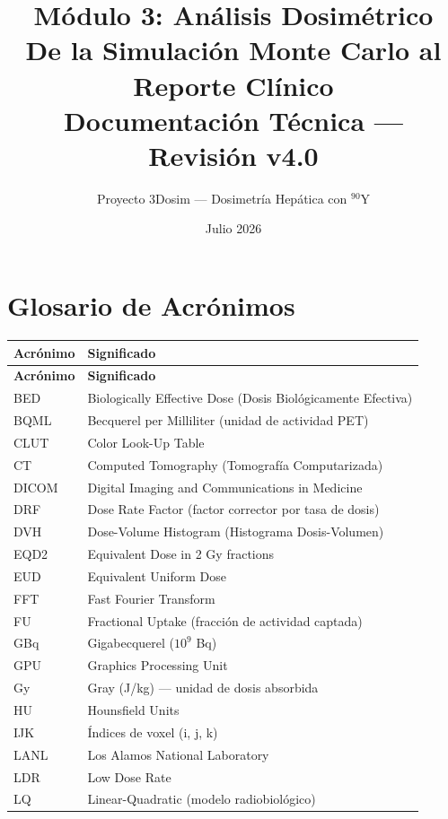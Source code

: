 \documentclass[12pt,a4paper]{article}
\title{\textbf{Módulo 3: Análisis Dosimétrico}\\[0.5cm]
       \large De la Simulación Monte Carlo al Reporte Clínico\\[0.3cm]
       \normalsize Documentación Técnica --- Revisión v4.0}
\author{Proyecto 3Dosim --- Dosimetría Hepática con $^{90}$Y}
\date{Julio 2026}
\begin{document}
\maketitle
\thispagestyle{empty}
\newpage

\section*{Glosario de Acrónimos}

\begin{longtable}{p{3.5cm} p{11cm}}
\toprule
\textbf{Acrónimo} & \textbf{Significado} \\
\midrule
\endfirsthead
\toprule
\textbf{Acrónimo} & \textbf{Significado} \\
\midrule
\endhead
\bottomrule
\endfoot
BED & Biologically Effective Dose (Dosis Biológicamente Efectiva) \\
BQML & Becquerel per Milliliter (unidad de actividad PET) \\
CLUT & Color Look-Up Table \\
CT & Computed Tomography (Tomografía Computarizada) \\
DICOM & Digital Imaging and Communications in Medicine \\
DRF & Dose Rate Factor (factor corrector por tasa de dosis) \\
DVH & Dose-Volume Histogram (Histograma Dosis-Volumen) \\
EQD2 & Equivalent Dose in 2 Gy fractions \\
EUD & Equivalent Uniform Dose \\
FFT & Fast Fourier Transform \\
FU & Fractional Uptake (fracción de actividad captada) \\
GBq & Gigabecquerel ($10^9$ Bq) \\
GPU & Graphics Processing Unit \\
Gy & Gray (J/kg) --- unidad de dosis absorbida \\
HU & Hounsfield Units \\
IJK & Índices de voxel (i, j, k) \\
LANL & Los Alamos National Laboratory \\
LDR & Low Dose Rate \\
LQ & Linear-Quadratic (modelo radiobiológico) \\

\end{longtable}
\end{document}
